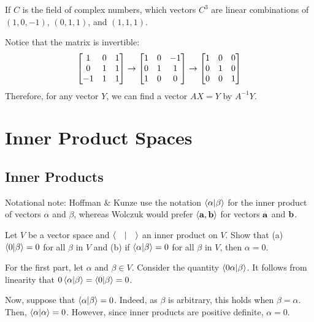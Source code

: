 \documentclass[notes]{agony}
\begin{document}
\begin{xca}
  If $C$ is the field of complex numbers, which vectors $C^3$ are linear combinations
  of $(1,0,-1)$, $(0,1,1)$, and $(1,1,1)$.
\end{xca}
\begin{sol}
  Notice that the matrix is invertible:
  \[ \mqty[1&0&1\\0&1&1\\-1&1&1] \to \mqty[1&0&-1\\0&1&1\\1&0&0] \to \mqty[1&0&0\\0&1&0\\0&0&1] \]
  Therefore, for any vector $Y$, we can find a vector $AX = Y$ by $A^{-1}Y$.
\end{sol}


\setcounter{chapter}{7}
\chapter{Inner Product Spaces}

\section{Inner Products}

Notational note: Hoffman \& Kunze use the notation $\ip{\alpha}{\beta}$ for the inner product of vectors $\alpha$ and $\beta$,
whereas Wolczuk would prefer $\ev{\vb{a}, \vb{b}}$ for vectors $\vb a$ and $\vb b$.

\begin{xca}
  Let $V$ be a vector space and $\ip{\quad}$ an inner product on $V$.
  Show that (a) $\ip{0}{\beta}=0$ for all $\beta$ in $V$ and (b) if $\ip{\alpha}{\beta} = 0$ for all $\beta$ in $V$, then $\alpha = 0$.
\end{xca}
\begin{prf}
  For the first part, let $\alpha$ and $\beta \in V$.
  Consider the quantity $\ip{0\alpha}{\beta}$.
  It follows from linearity that $0\ip{\alpha}{\beta} = \ip{0}{\beta} = 0$.

  Now, suppose that $\ip{\alpha}{\beta} = 0$.
  Indeed, as $\beta$ is arbitrary, this holds when $\beta = \alpha$.
  Then, $\ip{\alpha} = 0$.
  However, since inner products are positive definite, $\alpha = 0$.
\end{prf}
\end{document}

